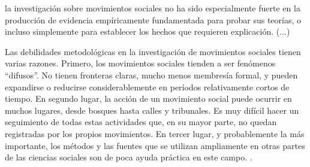 \documentclass[letterpaper, 11pt]{book}
\theoremstyle{definition}
\theoremstyle{remark}
\begin{document}
\begin{center}
    \begin{minipage}{0.9\linewidth}
        {\setlength{\parindent}{12pt}\small
        la investigación sobre movimientos sociales no ha sido especialmente fuerte en la producción de evidencia empíricamente fundamentada para probar sus teorías, o incluso simplemente para establecer los hechos que requieren explicación. (...)
        
        Las debilidades metodológicas en la investigación de movimientos sociales tienen varias razones. Primero, los movimientos sociales tienden a ser fenómenos ``difusos''. No tienen fronteras claras, mucho menos membresía formal, y pueden expandirse o reducirse considerablemente en períodos relativamente cortos de tiempo. En segundo lugar, la acción de un movimiento social puede ocurrir en muchos lugares, desde bosques hasta calles y tribunales. Es muy difícil hacer un seguimiento de todas estas actividades que, en su mayor parte, no quedan registradas por los propios movimientos. En tercer lugar, y probablemente la más importante, los métodos y las fuentes que se utilizan ampliamente en otras partes de las ciencias sociales son de poca ayuda práctica en este campo. \normalsize \citep[123--124]{1999_Koopmans_AEPWhere}.
        }
    \end{minipage}
\end{center}
\end{document}
